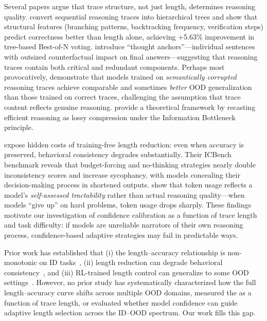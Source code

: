 Several papers argue that trace structure, not just length, determines reasoning quality. \citet{jiang2025goodchain} convert sequential reasoning traces into hierarchical trees and show that structural features (branching patterns, backtracking frequency, verification steps) predict correctness better than length alone, achieving +5.63\% improvement in tree-based Best-of-N voting. \citet{bogdan2025anchors} introduce ``thought anchors''---individual sentences with outsized counterfactual impact on final answers---suggesting that reasoning traces contain both critical and redundant components. Perhaps most provocatively, \citet{valmeekam2025reasonless} demonstrate that models trained on \emph{semantically corrupted} reasoning traces achieve comparable and sometimes \emph{better} OOD generalization than those trained on correct traces, challenging the assumption that trace content reflects genuine reasoning. \citet{massoli2026cib} provide a theoretical framework by recasting efficient reasoning as lossy compression under the Information Bottleneck principle.

\citet{yang2025longtoshort} expose hidden costs of training-free length reduction: even when accuracy is preserved, behavioral consistency degrades substantially. Their ICBench benchmark reveals that budget-forcing and no-thinking strategies nearly double inconsistency scores and increase sycophancy, with models concealing their decision-making process in shortened outputs. \citet{dellibarda2025illusion} show that token usage reflects a model's \emph{self-assessed tractability} rather than actual reasoning quality---when models ``give up'' on hard problems, token usage drops sharply. These findings motivate our investigation of confidence calibration as a function of trace length and task difficulty: if models are unreliable narrators of their own reasoning process, confidence-based adaptive strategies may fail in predictable ways.

Prior work has established that (i) the length--accuracy relationship is non-monotonic on ID tasks~\citep{wu2025more}, (ii) length reduction can degrade behavioral consistency~\citep{yang2025longtoshort}, and (iii) RL-trained length control can generalize to some OOD settings~\citep{aggarwal2025l1}. However, no prior study has systematically characterized how the full length--accuracy curve shifts across multiple OOD domains, measured the \robgap as a function of trace length, or evaluated whether model confidence can guide adaptive length selection across the ID--OOD spectrum. Our work fills this gap.
